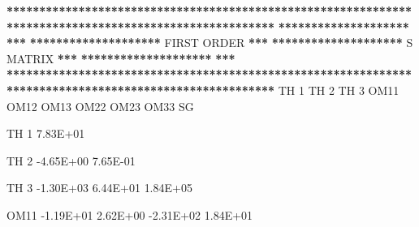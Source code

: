 \documentclass[
  11pt,
  krantz2,
  a4paper]{krantz}
\newenvironment{Shaded}{\begin{snugshade}}{\end{snugshade}}
\newcommand{\DecValTok}[1]{\textcolor[rgb]{0.00,0.00,0.81}{#1}}
\newcommand{\ErrorTok}[1]{\textcolor[rgb]{0.64,0.00,0.00}{\textbf{#1}}}
\newcommand{\FloatTok}[1]{\textcolor[rgb]{0.00,0.00,0.81}{#1}}
\newcommand{\NormalTok}[1]{#1}
\newcommand{\OperatorTok}[1]{\textcolor[rgb]{0.81,0.36,0.00}{\textbf{#1}}}
\newcommand{\StringTok}[1]{\textcolor[rgb]{0.31,0.60,0.02}{#1}}
\theoremstyle{definition}
\theoremstyle{definition}
\theoremstyle{definition}
\theoremstyle{remark}
\begin{document}
\begin{Shaded}
\begin{Highlighting}[]
                                                                                                       
\OperatorTok{**}\ErrorTok{*****************************************************************************************************}
\ErrorTok{********************}\StringTok{                                                                                }\ErrorTok{***}
\ErrorTok{********************}\StringTok{                                   }\NormalTok{FIRST ORDER                                  }\OperatorTok{**}\ErrorTok{*}
\ErrorTok{********************}\StringTok{                                     }\NormalTok{S MATRIX                                   }\OperatorTok{**}\ErrorTok{*}
\ErrorTok{********************}\StringTok{                                                                                }\ErrorTok{***}
\ErrorTok{*******************************************************************************************************}
\StringTok{                                                                                                       }
\StringTok{                                                                                                       }
\StringTok{           }\NormalTok{TH }\DecValTok{1}\NormalTok{      TH }\DecValTok{2}\NormalTok{      TH }\DecValTok{3}\NormalTok{      OM11      OM12      OM13      OM22      OM23      OM33      SG}
                                                                                                       
                                                                                                       
\NormalTok{TH }\DecValTok{1}    \FloatTok{7.83E+01}                                                                                       
                                                                                                       
\NormalTok{TH }\DecValTok{2}   \FloatTok{{-}4.65E+00}  \FloatTok{7.65E{-}01}                                                                             
                                                                                                       
\NormalTok{TH }\DecValTok{3}   \FloatTok{{-}1.30E+03}  \FloatTok{6.44E+01}  \FloatTok{1.84E+05}                                                                   
                                                                                                       
\NormalTok{OM11   }\FloatTok{{-}1.19E+01}  \FloatTok{2.62E+00} \FloatTok{{-}2.31E+02}  \FloatTok{1.84E+01}                                                         
                                                                                                       

\end{Highlighting}
\end{Shaded}
\end{document}
